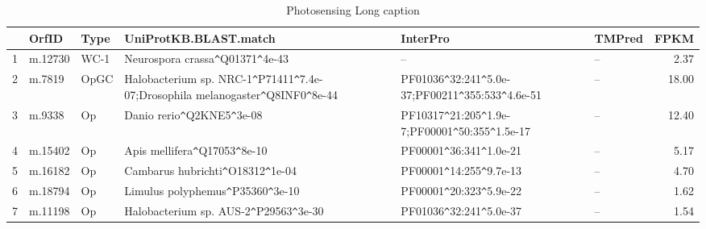 \begin{table}[tbp]
\centering
\begin{tabular}{rlllllr}
  \hline
\hline
 & OrfID & Type & UniProtKB.BLAST.match & InterPro & TMPred & FPKM \\ 
  \hline
1 & m.12730 & WC-1 & Neurospora crassa\verb|^|Q01371\verb|^|4e-43 & -- & -- & 2.37 \\ 
  2 & m.7819 & OpGC & Halobacterium sp. NRC-1\verb|^|P71411\verb|^|7.4e-07;Drosophila melanogaster\verb|^|Q8INF0\verb|^|8e-44 & PF01036\verb|^|32:241\verb|^|5.0e-37;PF00211\verb|^|355:533\verb|^|4.6e-51 & -- & 18.00 \\ 
  3 & m.9338 & Op & Danio rerio\verb|^|Q2KNE5\verb|^|3e-08 & PF10317\verb|^|21:205\verb|^|1.9e-7;PF00001\verb|^|50:355\verb|^|1.5e-17 & -- & 12.40 \\ 
  4 & m.15402 & Op & Apis mellifera\verb|^|Q17053\verb|^|8e-10 & PF00001\verb|^|36:341\verb|^|1.0e-21 & -- & 5.17 \\ 
  5 & m.16182 & Op & Cambarus hubrichti\verb|^|O18312\verb|^|1e-04 & PF00001\verb|^|14:255\verb|^|9.7e-13 & -- & 4.70 \\ 
  6 & m.18794 & Op & Limulus polyphemus\verb|^|P35360\verb|^|3e-10 & PF00001\verb|^|20:323\verb|^|5.9e-22 & -- & 1.62 \\ 
  7 & m.11198 & Op & Halobacterium sp. AUS-2\verb|^|P29563\verb|^|3e-30 & PF01036\verb|^|32:241\verb|^|5.0e-37 & -- & 1.54 \\ 
   \hline
\hline
\end{tabular}
\caption[Photosensing short caption]{Photosensing Long caption} 
\label{tab:ChClat_photosensing}
\end{table}
